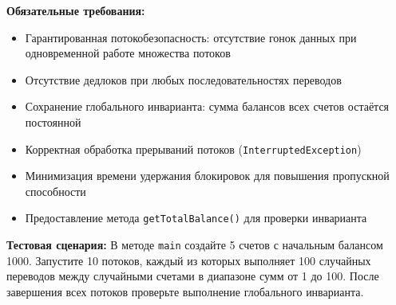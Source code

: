 \documentclass[12pt]{article}
\begin{document}
\textbf{Обязательные требования:}
\begin{itemize}
    \item Гарантированная потокобезопасность: отсутствие гонок данных при одновременной работе множества потоков
    \item Отсутствие дедлоков при любых последовательностях переводов
    \item Сохранение глобального инварианта: сумма балансов всех счетов остаётся постоянной
    \item Корректная обработка прерываний потоков (\texttt{InterruptedException})
    \item Минимизация времени удержания блокировок для повышения пропускной способности
    \item Предоставление метода \texttt{getTotalBalance()} для проверки инварианта
\end{itemize}

\textbf{Тестовая сценария:} В методе \texttt{main} создайте 5 счетов с начальным балансом 1000. Запустите 10 потоков, каждый из которых выполняет 100 случайных переводов между случайными счетами в диапазоне сумм от 1 до 100. После завершения всех потоков проверьте выполнение глобального инварианта.
\end{document}
